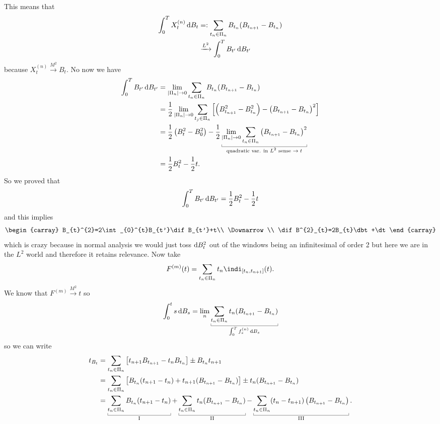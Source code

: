 \documentclass[12pt]{report}
\begin{document}
This means that
\begin{align*}
	\int_{0}^{T}X_{t}^{(n)}\mathop{}\!\mathrm{d} B_{t}&=:\sum_{t_{n}\in\Pi_{n}}B_{t_{n}}(B_{t_{n+1}}-B_{t_{n}})\\
	&\xrightarrow{L^{2}}\int_{0}^{T}B_{t'}\mathop{}\!\mathrm{d} B_{t'}
\end{align*}
because $X^{(n)}_{t}\xrightarrow{M^{2}}B_{t}$. No now we have
\begin{align*}
	\int_{0}^{T}B_{t'}\dif B_{t'}&=\lim_{|\Pi_{n}|\to0}\sum_{t_{n}\in\Pi_{n}}B_{t_{n}}(B_{t_{n+1}}-B_{t_{n}})\\
	&=\unmezz\lim_{|\Pi_{n}|\to0}\sum_{t_{j}\in\Pi_{n}}\left[\left(B^{2}_{t_{n+1}}-B^{2}_{t_{n}}\right)-\left(B_{t_{n+1}}-B_{t_{n}}\right)^{2}\right]\\
	&=\unmezz\left(B^{2}_{t}-B^{2}_{0}\right)-\unmezz\ubracketthin{\lim_{|\Pi_{n}|\to0}\sum_{t_{n}\in\Pi_{n}}\left(B_{t_{n+1}}-B_{t_{n}}\right)^{2}}_{\claptext{quadratic var. in $L^{2}$ sense $\to t$}}\\
	&=\unmezz B^{2}_{t}-\unmezz t.
\end{align*}
So we proved that 
\begin{equation*}
	\int_{0}^{T}B_{t'}\mathop{}\!\mathrm{d} B_{t'}=\frac{1}{2} B^{2}_{t}-\frac{1}{2} t
\end{equation*}
and this implies
\begin{equation*}
	\begin{carray}
		B_{t}^{2}=2\int_{0}^{t}B_{t'}\dif B_{t'}+t\\
		\Downarrow\\
		\dif B^{2}_{t}=2B_{t}\dbt+\dt
	\end{carray}
\end{equation*}
which is crazy because in normal analysis we would just toss $\mathop{}\!\mathrm{d} B^{2}_{t}$ out of the windows being an infinitesimal of order 2 but here we are in the $L^{2}$ world and therefore it retains relevance. Now take
\begin{equation*}
	F^{(m)}(t)=\sum_{t_{n}\in\Pi_{n}}t_{n}\indi_{[t_{n},t_{n+1}]}(t).
\end{equation*}
We know that $F^{(m)}\xrightarrow{M^{2}}t$ so
\begin{equation*}
	\int_{0}^{t}s\dbs=\lim_{n}\ubracketthin{\sum_{t_{n}\in\Pi_{n}}t_{n}(B_{t_{n+1}}-B_{t_{n}})}_{\int_{0}^{T}f_{s}^{(n)}\dbs}
\end{equation*}
so we can write
\begin{align*}
	t_{B_{t}}&=\sum_{t_{n}\in\Pi_{n}}\left[t_{n+1}B_{t_{n+1}}-t_{n}B_{t_{n}}\right]\pm B_{t_{n}}t_{n+1}\\
	&=\sum_{t_{n}\in\Pi_{n}}\left[B_{t_{n}}(t_{n+1}-t_{n})+t_{n+1}(B_{t_{n+1}}-B_{t_{n}})\right]\pm t_{n}(B_{t_{n+1}}-B_{t_{n}})\\
	&=\ubracketthin{\sum_{t_{n}\in\Pi_{n}}B_{t_{n}}(t_{n+1}-t_{n})}_{\mathrm{I}}+\ubracketthin{\sum_{t_{n}\in\Pi_{n}}t_{n}(B_{t_{n+1}}-B_{t_{n}})}_{\mathrm{II}}-\ubracketthin{\sum_{t_{n}\in\Pi_{n}}(t_{n}-t_{n+1})\left(B_{t_{n+1}}-B_{t_{n}}\right)}_{\mathrm{III}}.
\end{align*}
\end{document}
